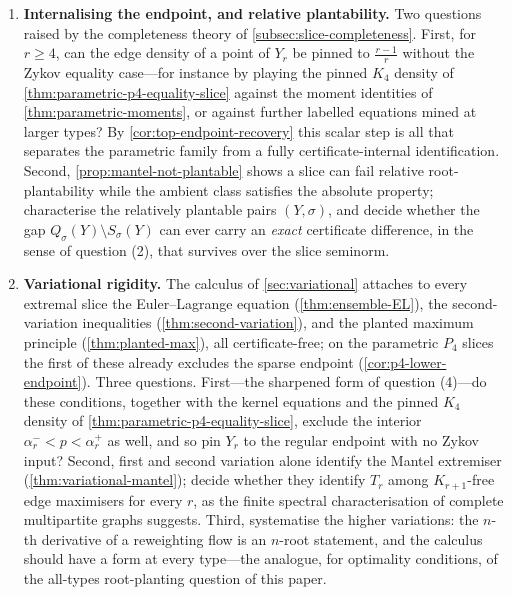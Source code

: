 \documentclass[11pt]{article}
\theoremstyle{definition}
\begin{document}
\begin{enumerate}[label=\textup{(\arabic*)}, leftmargin=2.8em]
  \item \textbf{Internalising the endpoint, and relative plantability.}
  Two questions raised by the completeness theory of
  \cref{subsec:slice-completeness}.  First, for $r\ge4$, can the edge density of a
  point of $Y_r$ be pinned to $\frac{r-1}r$ without the Zykov equality case---for
  instance by playing the pinned $K_4$ density of
  \cref{thm:parametric-p4-equality-slice} against the moment identities of
  \cref{thm:parametric-moments}, or against further labelled equations mined at larger
  types?  By \cref{cor:top-endpoint-recovery} this scalar step is all that separates
  the parametric family from a fully certificate-internal identification.  Second,
  \cref{prop:mantel-not-plantable} shows a slice can fail relative root-plantability
  while the ambient class satisfies the absolute property; characterise the relatively
  plantable pairs $(Y,\sigma)$, and decide whether the gap
  $Q_\sigma(Y)\setminus S_\sigma(Y)$ can ever carry an \emph{exact} certificate
  difference, in the sense of question (2), that survives over the slice seminorm.

  \item \textbf{Variational rigidity.}
  The calculus of \cref{sec:variational} attaches to every extremal slice the
  Euler--Lagrange equation (\cref{thm:ensemble-EL}), the second-variation
  inequalities (\cref{thm:second-variation}), and the planted maximum principle
  (\cref{thm:planted-max}), all certificate-free; on the parametric $P_4$ slices the
  first of these already excludes the sparse endpoint
  (\cref{cor:p4-lower-endpoint}).  Three questions.  First---the sharpened form of
  question (4)---do these conditions, together with the kernel equations and the
  pinned $K_4$ density of \cref{thm:parametric-p4-equality-slice}, exclude the
  interior $\alpha_r^-<p<\alpha_r^+$ as well, and so pin $Y_r$ to the regular
  endpoint with no Zykov input?  Second, first and second variation alone identify
  the Mantel extremiser (\cref{thm:variational-mantel}); decide whether they identify
  $T_r$ among $K_{r+1}$-free edge maximisers for every $r$, as the finite spectral
  characterisation of complete multipartite graphs \cite{Smith1970} suggests.  Third,
  systematise the higher variations: the $n$-th derivative of a reweighting flow is
  an $n$-root statement, and the calculus should have a form at every type---the
  analogue, for optimality conditions, of the all-types root-planting question of
  this paper.
\end{enumerate}
\end{document}
